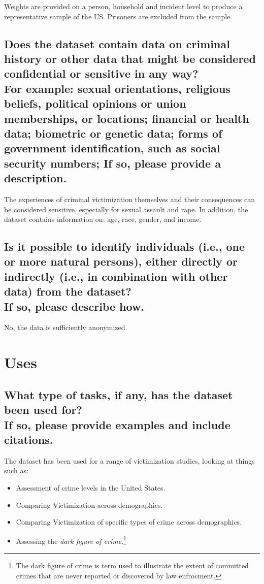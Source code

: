 \documentclass[letterpaper, 10 pt, conference]{ieeeconf}  %
\newcommand{\subtitle}[1]{{\\ \small \normalfont \color{purple} #1}}
\begin{document}
Weights are provided on a person, household and incident level to produce a representative sample of the US. Prisoners are excluded from the sample. 

\subsection{Does the dataset contain data on criminal history or other data that might be considered confidential or sensitive in any way? \subtitle{For example: sexual orientations, religious beliefs, political opinions or union memberships, or locations; financial or health data; biometric or genetic data; forms of government identification, such as social security numbers; If so, please provide a description.}}


The experiences of criminal victimization themselves and their consequences can be considered sensitive, especially for sexual assault and rape. In addition, the dataset contains information on: age, race, gender, and income. 

\subsection{Is it possible to identify individuals (i.e., one or more natural persons), either directly or indirectly (i.e., in combination with other data) from the dataset? \subtitle{If so, please describe how.}}

No, the data is sufficiently anonymized.


\section{Uses}

\subsection{What type of tasks, if any, has the dataset been used for? \subtitle{If so, please provide examples and include citations.}}

The dataset has been used for a range of victimization studies, looking at things such as:

\begin{itemize}
    \item Assessment of crime levels in the United States.
    \item Comparing Victimization across demographics.
    \item Comparing Victimization of specific types of crime across demographics.
    \item Assessing the \textit{dark figure of crime}.\footnote{The dark figure of crime is term used to illustrate the extent of  committed crimes that are never reported or discovered by law enfrocment.}
\end{itemize}
\end{document}
